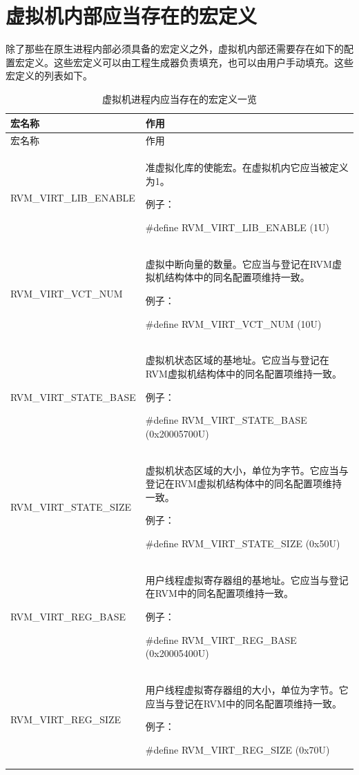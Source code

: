 \section{虚拟机内部应当存在的宏定义}\label{sec:4-3}

除了那些在原生进程内部必须具备的宏定义之外，虚拟机内部还需要存在如下的配置宏定义。这些宏定义可以由工程生成器负责填充，也可以由用户手动填充。这些宏定义的列表如下。

\begin{xltabular}{\textwidth}{@{}>{\hsize\raggedright\arraybackslash}X>{\hsize\raggedright\arraybackslash}X@{}}
\caption{虚拟机进程内应当存在的宏定义一览}\label{tab:4-3}\\
\toprule
宏名称 & 作用\tabularnewline
\endfirsthead
\toprule
宏名称 & 作用\tabularnewline
\midrule
\endhead
\bottomrule
\endlastfoot
RVM\_\allowbreak{}VIRT\_\allowbreak{}LIB\_\allowbreak{}ENABLE\strut
 & 准虚拟化库的使能宏。在虚拟机内它应当被定义为1。

例子：

\#define RVM\_\allowbreak{}VIRT\_\allowbreak{}LIB\_\allowbreak{}ENABLE (1U)\strut
\tabularnewline
RVM\_\allowbreak{}VIRT\_\allowbreak{}VCT\_\allowbreak{}NUM\strut
 & 虚拟中断向量的数量。它应当与登记在RVM虚拟机结构体中的同名配置项维持一致。

例子：

\#define RVM\_\allowbreak{}VIRT\_\allowbreak{}VCT\_\allowbreak{}NUM (10U)\strut
\tabularnewline
RVM\_\allowbreak{}VIRT\_\allowbreak{}STATE\_\allowbreak{}BASE\strut
 & 虚拟机状态区域的基地址。它应当与登记在RVM虚拟机结构体中的同名配置项维持一致。

例子：

\#define RVM\_\allowbreak{}VIRT\_\allowbreak{}STATE\_\allowbreak{}BASE (0x20005700U)\strut
\tabularnewline
RVM\_\allowbreak{}VIRT\_\allowbreak{}STATE\_\allowbreak{}SIZE\strut
 & 虚拟机状态区域的大小，单位为字节。它应当与登记在RVM虚拟机结构体中的同名配置项维持一致。

例子：

\#define RVM\_\allowbreak{}VIRT\_\allowbreak{}STATE\_\allowbreak{}SIZE (0x50U)\strut
\tabularnewline
RVM\_\allowbreak{}VIRT\_\allowbreak{}REG\_\allowbreak{}BASE\strut
 & 用户线程虚拟寄存器组的基地址。它应当与登记在RVM中的同名配置项维持一致。

例子：

\#define RVM\_\allowbreak{}VIRT\_\allowbreak{}REG\_\allowbreak{}BASE (0x20005400U)\strut
\tabularnewline
RVM\_\allowbreak{}VIRT\_\allowbreak{}REG\_\allowbreak{}SIZE\strut
 & 用户线程虚拟寄存器组的大小，单位为字节。它应当与登记在RVM中的同名配置项维持一致。

例子：

\#define RVM\_\allowbreak{}VIRT\_\allowbreak{}REG\_\allowbreak{}SIZE (0x70U)\strut
\tabularnewline
\end{xltabular}

